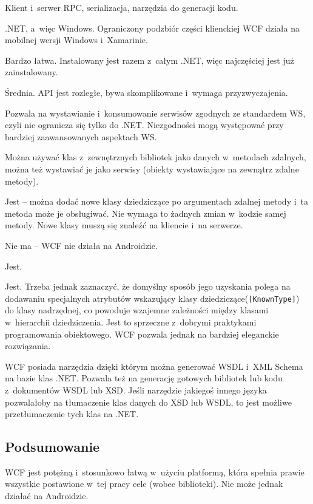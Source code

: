 \begin{description}
Klient i~serwer RPC, serializacja, narzędzia do generacji kodu.

.NET, a~więc Windows. Ograniczony podzbiór części klienckiej WCF działa na mobilnej wersji Windows i~Xamarinie.

Bardzo łatwa. Instalowany jest razem z~całym .NET, więc najczęściej jest już zainstalowany.

Średnia. API jest rozległe, bywa skomplikowane i~wymaga przyzwyczajenia.

Pozwala na wystawianie i~konsumowanie serwisów zgodnych ze standardem WS, czyli nie ogranicza się tylko do .NET.
Niezgodności mogą występować przy bardziej zaawansowanych aspektach WS.

Można używać klas z~zewnętrznych bibliotek jako danych w~metodach zdalnych, można też wystawiać je jako serwisy (obiekty wystawiające na zewnątrz zdalne metody).

Jest -- można dodać nowe klasy dziedziczące po argumentach zdalnej metody i~ta metoda może je obsługiwać. Nie wymaga to żadnych zmian w~kodzie samej metody. Nowe klasy muszą się znaleźć na kliencie i~na serwerze.

Nie ma -- WCF nie działa na Androidzie.

Jest.

Jest.
Trzeba jednak zaznaczyć, że domyślny sposób jego uzyskania polega na dodawaniu specjalnych atrybutów wskazujący klasy dziedziczące(\texttt{[KnownType]}) do klasy nadrzędnej, co powoduje wzajemne zależności między klasami w~hierarchii dziedziczenia. Jest to sprzeczne z~dobrymi praktykami programowania obiektowego.
WCF pozwala jednak na bardziej eleganckie rozwiązania.

WCF posiada narzędzia dzięki którym można generować WSDL i~XML Schema na bazie klas .NET.
Pozwala też na generację gotowych bibliotek lub kodu z~dokumentów WSDL lub XSD.
Jeśli narzędzie jakiegoś innego języka pozwalałoby na tłumaczenie klas danych do XSD lub WSDL, to jest możliwe przetłumaczenie tych klas na .NET.
\end{description}

\subsection{Podsumowanie}
WCF jest potężną i~stosunkowo łatwą w~użyciu platformą, która spełnia prawie wszystkie postawione w~tej pracy cele (wobec biblioteki).
Nie może jednak działać na Androidzie.



